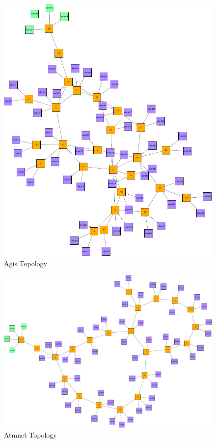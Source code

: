 \begin{figure}[htbp]
    \centering
    \includegraphics[width=\linewidth]{Networks/Agis_final.pdf}
    \caption{Agis Topology}
    \label{fig:Agis}
\end{figure}

\begin{figure}[htbp]
    \centering
    \includegraphics[width=\linewidth]{Networks/Atmnet_final.pdf}
    \caption{Atmnet Topology}
    \label{fig:Atmnet}
\end{figure}


